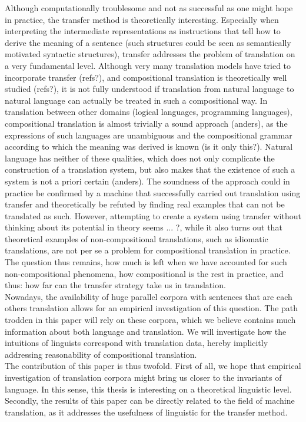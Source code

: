 \documentclass[a4paper, 11pt]{report}
\theoremstyle{definition}
\theoremstyle{plain}
\begin{document}
Although computationally troublesome and not as successful as one might hope in practice, the transfer method is theoretically interesting. Especially when interpreting the intermediate representations as instructions that tell how to derive the meaning of a sentence (such structures could be seen as semantically motivated syntactic structures), transfer addresses the problem of translation on a very fundamental level. Although very many translation models have tried to incorporate transfer (refs?), and compositional translation is theoretically well studied (refs?), it is not fully understood if translation from natural language to natural language can actually be treated in such a compositional way. In translation between other domains (logical languages, programming languages), compositional translation is almost trivially a sound approach (anders), as the expressions of such languages are unambiguous and the compositional grammar according to which the meaning was derived is known (is it only this?). Natural language has neither of these qualities, which does not only complicate the construction of a translation system, but also makes that the existence of such a system is not a priori certain (anders).  The soundness of the approach could in practice be confirmed by a machine that successfully carried out translation using transfer and theoretically be refuted by finding real examples that can not be translated as such. However, attempting to create a system using transfer without thinking about its potential in theory seems ... ?, while it also turns out that theoretical examples of non-compositional translations, such as idiomatic translations, are not per se a problem for compositional translation in practice. The question thus remains, how much is left when we have accounted for such non-compositional phenomena, how compositional is the rest in practice, and thus: how far can the transfer strategy take us in translation.\\
Nowadays, the availability of huge parallel corpora with sentences that are each others translation allows for an empirical investigation of this question. The path trodden in this paper will rely on these corpora, which we believe contains much information about both language and translation. We will investigate how the intuitions of linguists correspond with translation data, hereby implicitly addressing reasonability of compositional translation.\\
The contribution of this paper is thus twofold. First of all, we hope that empirical investigation of translation corpora might bring us closer to the invariants of language. In this sense, this thesis is interesting on a theoretical linguistic level. Secondly, the results of this paper can be directly related to the field of machine translation, as it addresses the usefulness of linguistic for the transfer method.
\end{document}
